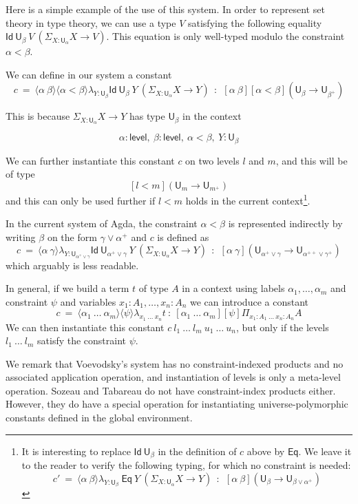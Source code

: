 \documentclass[11pt,a4paper]{article}
\theoremstyle{definition}
\newcommand{\Id}{\mathsf{Id}}
\newcommand{\Eq}{\mathsf{Eq}}
\newcommand{\UU}{\mathsf{U}}
\newcommand{\Level}{\mathsf{level}}
\newcommand{\lam}[1]{{\langle}#1{\rangle}}
\begin{document}
Here is a simple example of the use of this system.
In order to represent set theory in type
theory, we can use a type $V$ satisfying the following equality $\Id~{\UU_{\beta}}~V~(\Sigma_{X:\UU_{\alpha}}X\rightarrow V)$.
This equation is only well-typed modulo the constraint $\alpha<\beta$.

We can define in our system a constant
$$
c~=~\lam{\alpha~\beta}\lam{\alpha<\beta}\lambda_{Y:\UU_{\beta}}\Id~{\UU_{\beta}}~Y~ (\Sigma_{X:\UU_{\alpha}}X\rightarrow Y)~~:~~
   [\alpha~\beta][\alpha<\beta](\UU_{\beta} \rightarrow \UU_{\beta^+})
$$

   This is because $\Sigma_{X:\UU_{\alpha}}X\rightarrow Y$ has type $\UU_{\beta}$ in the context

   $$\alpha:\Level,~\beta:\Level,~\alpha<\beta,~Y:\UU_{\beta}$$

   We can further instantiate this constant $c$ on two levels $l$ and $m$, and this will be of type
   $$[l<m](\UU_{m} \rightarrow \UU_{m^+})$$
   and this can only be used further if $l<m$ holds in the current
   context\footnote{It is interesting to replace $\Id~\UU_\beta$ in the
   definition of
$c$ above by $\Eq$. We leave it to the reader to verify the
following typing, for which no constraint is needed:
$$
c'~=~\lam{\alpha~\beta}\lambda_{Y:\UU_{\beta}}~\Eq~Y~ (\Sigma_{X:\UU_{\alpha}}X\rightarrow Y)~~:~~
   [\alpha~\beta](\UU_{\beta} \rightarrow \UU_{\beta\vee\alpha^+})
$$}.

\medskip


In the current system of Agda, the constraint $\alpha<\beta$ is represented indirectly by
writing $\beta$ on the form $\gamma\vee \alpha^+$ and $c$ is defined as
$$
c~=~\lam{\alpha~\gamma}\lambda_{Y:\UU_{\alpha^+\vee\gamma}}\Id~{\UU_{\alpha^+\vee\gamma}}~Y~ (\Sigma_{X:\UU_{\alpha}}X\rightarrow Y)~~:~~[\alpha~\gamma]  (\UU_{\alpha^+\vee\gamma} \rightarrow \UU_{\alpha^{++}\vee\gamma^+})
$$
   which arguably is less readable.

\medskip

In general, if we  build a term $t$ of type $A$ in a context using labels $\alpha_1,\dots,\alpha_m$
and constraint $\psi$ and variables $x_1:A_1,\dots,x_n:A_n$ we can introduce a constant
$$
c~=~ \lam{\alpha_1~\dots~\alpha_m}\lam{\psi}\lambda_{x_1~\dots~x_n}t ~:~
[\alpha_1~\dots~\alpha_m][\psi]\Pi_{x_1:A_1~\dots~x_n:A_n}A
$$
We can then instantiate this constant $c~l_1~\dots~l_m~u_1~\dots~u_n$, but only if the levels
$l_1~\dots~l_m$ satisfy the constraint $\psi$.

We remark that Voevodsky's system \cite{VV} has no constraint-indexed products and no associated application operation, and instantiation of levels is only a meta-level operation. Sozeau and Tabareau \cite{SozeauTabareau:coq} do not have constraint-index products either. However, they do have a special operation %
 for instantiating universe-polymorphic constants defined in the global environment.
%
\end{document}
